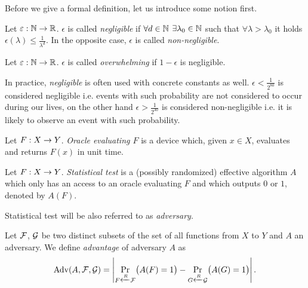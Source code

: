 Before we give a formal definition, let us introduce some notion first.

\begin{defn}
\label{def:neglfunc}
	Let $\varepsilon:\mathbb{N}\rightarrow\mathbb{R}$. $\epsilon$ is called {\em negligible} if $\forall d\in\mathbb{N}$ $\exists \lambda_0\in\mathbb{N}$ such that $\forall \lambda>\lambda_0$ it holds $\epsilon(\lambda)\leq\frac{1}{\lambda^d}$. In the opposite case, $\epsilon$ is called {\em non-negligible}.
\end{defn}

\begin{defn}
\label{def:overwh}
	Let $\varepsilon:\mathbb{N}\rightarrow\mathbb{R}$. $\epsilon$ is called {\em overwhelming} if $1-\epsilon$ is negligible.
\end{defn}

\begin{note}
\label{note:neglconst}
	In practice, {\em negligible} is often used with concrete constants as well. $\epsilon<\frac{1}{2^{80}}$ is considered negligible i.e. events with such probability are not considered to occur during our lives, on the other hand $\epsilon>\frac{1}{2^{30}}$ is considered non-negligible i.e. it is likely to observe an event with such probability.
\end{note}


\begin{defn}[Oracle]
	Let $F:X\rightarrow Y$. {\em Oracle evaluating $F$} is a device which, given $x\in X$, evaluates and returns $F(x)$ in unit time.
\end{defn}

\begin{defn}   %
	Let $F:X\rightarrow Y$. {\em Statistical test} is a (possibly randomized) effective algorithm $A$ which only has an access to an oracle evaluating $F$ and which outputs $0$ or $1$, denoted by $A(F)$.
\end{defn}

\begin{note}
	Statistical test will be also referred to as {\em adversary}.
\end{note}

\begin{defn}[Advantage]
\label{def:advant}
	Let $\cal F$, $\cal G$ be two distinct subsets of the set of all functions from $X$ to $Y$ and $A$ an adversary. We define {\em advantage} of adversary $A$ as
	\[
		\operatorname*{Adv}(A,{\cal F},{\cal G}) = \left| \Pr\limits_{F\xleftarrow{R} {\cal F}}\bigl(A(F)=1\bigr) - \Pr\limits_{G\xleftarrow{R} {\cal G}}\bigl(A(G)=1\bigr) \right| .
	\]
\end{defn}

